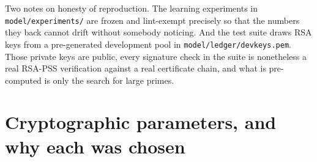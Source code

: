 Two notes on honesty of reproduction. The learning experiments in
\texttt{model/experiments/} are frozen and lint-exempt precisely so that the
numbers they back cannot drift without somebody noticing. And the test suite
draws RSA keys from a pre-generated development pool in
\texttt{model/ledger/devkeys.pem}. Those private keys are public, every
signature check in the suite is nonetheless a real RSA-PSS verification against a
real certificate chain, and what is pre-computed is only the search for large
primes.

\section{Cryptographic parameters, and why each was chosen}

